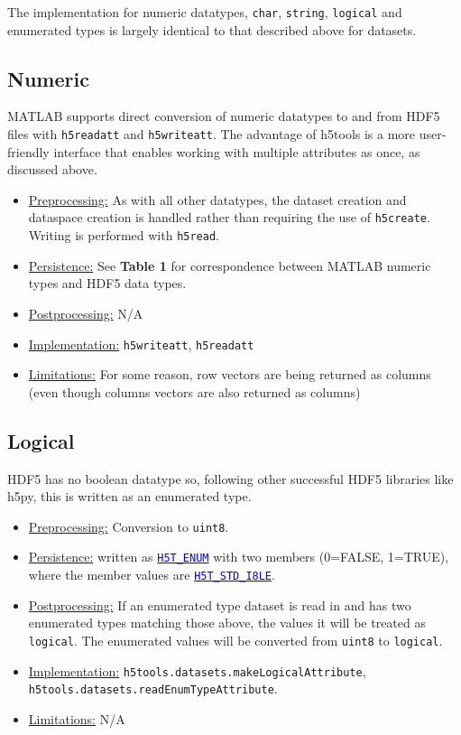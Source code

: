 \documentclass[11pt]{exam}
\newcommand\myurl[1]{\textcolor{blue}{\underline{#1}}}
\newcommand\myfcn[1]{\colorbox{codegray}{\textcolor{codeblue}{\texttt{#1}}}}
\newcommand\matfcn[1]{\textcolor{darkteal}{\texttt{#1}}}
\newcommand\hdftype[1]{\texttt{\myurl{#1}}}
\begin{document}
		\noindent The implementation for numeric datatypes, \texttt{char}, \texttt{string}, \texttt{logical} and enumerated types is largely identical to that described above for datasets. 
		

        \subsection{Numeric}
        \noindent MATLAB supports direct conversion of numeric datatypes to and from HDF5 files with \matfcn{h5readatt} and \matfcn{h5writeatt}. The advantage of h5tools is a more user-friendly interface that enables working with multiple attributes as once, as discussed above.
        \begin{itemize}
	        \item \underline{Preprocessing:} As with all other datatypes, the dataset creation and dataspace creation is handled rather than requiring the use of \matfcn{h5create}. Writing is performed with \matfcn{h5read}.
	        \item \underline{Persistence:} See \textbf{Table 1} for correspondence between MATLAB numeric types and HDF5 data types.
	        \item \underline{Postprocessing:} N/A
			\item \underline{Implementation:} \matfcn{h5writeatt}, \matfcn{h5readatt}
			\item \underline{Limitations:} For some reason, row vectors are being returned as columns (even though columns vectors are also returned as columns)
	    \end{itemize}

		\subsection{Logical}
		\noindent HDF5 has no boolean datatype so, following other successful HDF5 libraries like h5py, this is written as an enumerated type.
		\begin{itemize}
			\item \underline{Preprocessing:} Conversion to \texttt{uint8}.
			\item \underline{Persistence:} written as \myurl{\texttt{H5T\_ENUM}} with two members (0=FALSE, 1=TRUE), where the member values are \hdftype{H5T\_STD\_I8LE}. 
			\item \underline{Postprocessing:} If an enumerated type dataset is read in and has two enumerated types matching those above, the values it will be treated as \texttt{logical}. The enumerated values will be converted from \texttt{uint8} to \texttt{logical}. 
			\item \underline{Implementation:} \myfcn{h5tools.datasets.makeLogicalAttribute},\\ \myfcn{h5tools.datasets.readEnumTypeAttribute}.
			\item \underline{Limitations:} N/A
		\end{itemize}
        
\end{document}
